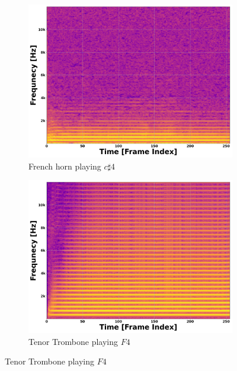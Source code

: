 \documentclass[12pt,letterpaper]{article}
\begin{document}
\begin{figure}[H]
	\begin{subfigure}{0.45\textwidth}
	\centering
	\includegraphics[scale=0.2]{../FiguresSpectrogram/FRENCHHORN-Cs4}
	\caption{French horn playing $c\sharp 4$}
	\end{subfigure}
	\hfill
	\begin{subfigure}{0.45\textwidth}
	\centering
	\includegraphics[scale=0.2]{../FiguresSpectrogram/TenorTrombone-F4}
	\caption{Tenor Trombone playing $F4$}
	\end{subfigure}
	

\end{figure}
\end{document}
